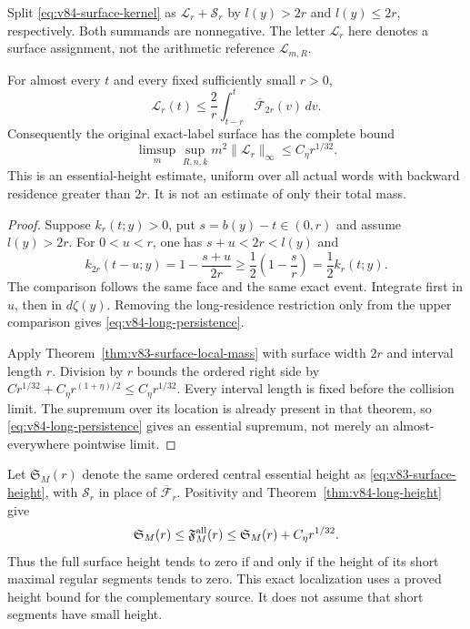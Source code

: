 Split \eqref{eq:v84-surface-kernel} as $\mathcal L_r+\mathcal S_r$
by $l(y)>2r$ and $l(y)\le2r$, respectively. Both summands are
nonnegative. The letter $\mathcal L_r$ here denotes a surface
assignment, not the arithmetic reference $\mathcal L_{m,R}$.

\begin{theorem}
\label{thm:v84-long-height}
For almost every $t$ and every fixed sufficiently small $r>0$,
\begin{equation}\label{eq:v84-long-persistence}
 \mathcal L_r(t)\le\frac2r\int_{t-r}^{t}
                                    \overline{\mathcal F}_{2r}(v)\,dv.
\end{equation}
Consequently the original exact-label surface has the complete bound
\begin{equation}\label{eq:v84-long-height}
 \limsup_m\sup_{R,n,k}m^2\|\mathcal L_r\|_\infty
                              \le C_\eta r^{1/32}.
\end{equation}
This is an essential-height estimate, uniform over all actual words
with backward residence greater than $2r$. It is not an estimate of
only their total mass.
\end{theorem}
\begin{proof}
Suppose $k_r(t;y)>0$, put $s=b(y)-t\in(0,r)$ and assume $l(y)>2r$.
For $0<u<r$, one has $s+u<2r<l(y)$ and
\[
 k_{2r}(t-u;y)=1-\frac{s+u}{2r}
                       \ge\frac12\left(1-\frac sr\right)
                       =\frac12k_r(t;y).
\]
The comparison follows the same face and the same exact event.
Integrate first in $u$, then in $d\zeta(y)$. Removing the
long-residence restriction only from the upper comparison gives
\eqref{eq:v84-long-persistence}.

Apply Theorem~\ref{thm:v83-surface-local-mass} with surface width
$2r$ and interval length $r$. Division by $r$ bounds the ordered
right side by
$C r^{1/32}+C_\eta r^{(1+\eta)/2}\le C_\eta r^{1/32}$.
Every interval length is fixed before the collision limit. The
supremum over its location is already present in that theorem,
so \eqref{eq:v84-long-persistence} gives an essential supremum,
not merely an almost-everywhere pointwise limit.
\end{proof}

Let $\mathfrak S_M(r)$ denote the same ordered central essential
height as \eqref{eq:v83-surface-height}, with $\mathcal S_r$ in
place of $\overline{\mathcal F}_r$. Positivity and
Theorem~\ref{thm:v84-long-height} give
\begin{equation}\label{eq:v84-short-equivalence}
 \mathfrak S_M(r)\le\mathfrak F_M^{\rm all}(r)
       \le\mathfrak S_M(r)+C_\eta r^{1/32}.
\end{equation}
Thus the full surface height tends to zero if and only if the height
of its short maximal regular segments tends to zero. This exact
localization uses a proved height bound for the complementary source.
It does not assume that short segments have small height.
